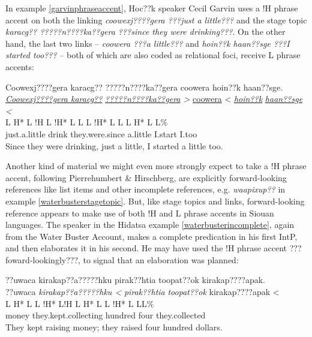 \documentclass[output=paper]{LSP/langsci}
\begin{document}
In example \ref{garvinphraseaccent}, Hoc??k speaker Cecil Garvin uses a !H phrase accent on both the linking \emph{coowexj????gera ???just a little???} and the stage topic \emph{karacg?? ?????n????ka??gera ???since they were drinking???}. On the other hand, the last two links -- \emph{coowera ???a little???} and \emph{hoin??k	haan??sge ???I started too???} -- both of which are also coded as relational foci, receive L phrase accents:

\ea\label{garvinphraseaccent}
 	Coowexj????gera karacg?? ?????n????ka??gera coowera hoin??k haan??sge.\footnotemark\\
\glll	\emph{\underline{Coowexj????gera	}}	\emph{\underline{karacg??}}	\emph{\underline{?????n????ka??gera}	>}	{\underline{coowera} <}	\emph{\underline{hoin??k}}	\emph{\underline{haan??sge} <}\\
	{\ob L H* L !H\cb}				{\ob L !H* L}				{L\cb}	{\ob L !H* L L\cb}		{\ob L H* L}						{\hspaceThis{haan??s}\ob\hspaceThis{ }L\%}\\
	just.a.little					drink					they.were.since				a.little				I.start						I.too\\
\glt	Since they were drinking, just a little, I started a little too.
\z

Another kind of material we might even more strongly expect to take a !H phrase accent, following Pierrehumbert \& Hirschberg, are explicitly forward-looking references like list items and other incomplete references, e.g. \emph{waapixup??} in example \ref{waterbusterstagetopic}. But, like stage topics and links, forward-looking reference appears to make use of both !H and L phrase accents in Siouan languages. The speaker in the Hidatsa example \ref{waterbusterincomplete}, again from the Water Buster Account, makes a complete predication in his first IntP, and then elaborates it in his second. He may have used the !H phrase accent ???foward-lookingly???, to signal that an elaboration was planned:

\ea\label{waterbusterincomplete}
 	??uwaca kirakap??a?????hku pirak??htia toopat??ok kirakap????apak.\footnotemark\\
\glll	??uwaca	\emph{kirakap??a?????hku <}		\emph{pirak??htia}	\emph{toopat??ok}	{kirakap????apak <}\\
	{\ob L H* L}	{L !H* L!H\cb}	{\ob L H* L}		{}			{L !H* L L\cb{}L\%}\\
	money	they.kept.collecting			hundred		four			they.collected\\
\glt	They kept raising money; they raised four hundred dollars.
\z
\end{document}
